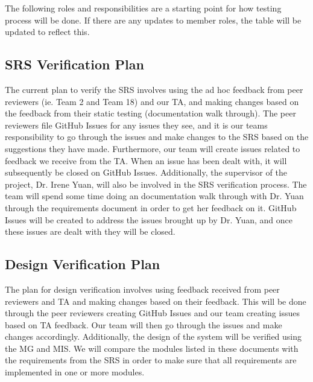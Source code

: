 \documentclass[12pt, titlepage]{article}
\begin{document}
The following roles and responsibilities are a starting point for how testing process will be done. If there are any updates to member roles, the table will be updated to reflect this.

\subsection{SRS Verification Plan} \label{SRSVerification}


The current plan to verify the SRS involves using the ad hoc feedback from peer reviewers (ie. Team 2 and Team 18) and our TA, and making changes based on
the feedback from their static testing (documentation walk through). The peer reviewers file GitHub Issues for any issues they see, and it is our teams responsibility to go through the issues and make changes to the SRS based on the suggestions they have made. Furthermore, our team will create issues related to feedback we receive from the TA. When an issue has been dealt with, it will subsequently be closed on GitHub Issues. Additionally, the supervisor of the project, Dr. Irene Yuan, will also be involved in the SRS verification process. The team will spend some time doing an documentation walk through with Dr. Yuan through the requirements document in order to get her feedback on it. GitHub Issues will be created to address the issues brought up by Dr. Yuan, and once these issues are dealt with they will be closed.

\subsection{Design Verification Plan}



The plan for design verification involves using feedback received from peer reviewers and TA and making changes based on their feedback. This will be done through the peer reviewers creating GitHub Issues and our team creating issues based on TA feedback. Our team will then go through the issues and make changes accordingly. Additionally, the design of the system will be verified using the MG and MIS. We will compare the modules listed in these documents with the requirements from the SRS in order to make sure that all requirements are implemented in one or more modules. 
\end{document}
